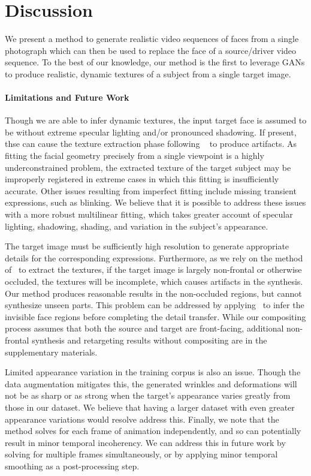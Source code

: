 
\section{Discussion}

We present a method to generate realistic video sequences of faces from a single photograph 
which can then be used to replace the face of a source/driver video sequence. To the best of our knowledge, our method is the first to leverage GANs to produce realistic, dynamic textures of a subject from a single target image.

\paragraph{Limitations and Future Work}
Though we are able to infer dynamic textures, the input target face is assumed to be without extreme specular lighting and/or pronounced shadowing. If present, thse can cause the texture extraction phase following ~\cite{f2f} to produce artifacts. As fitting the facial geometry precisely from a single viewpoint is a highly underconstrained problem, the extracted texture of the target subject may be improperly registered in extreme cases in which this fitting is insufficiently accurate. Other issues resulting from imperfect fitting include missing transient expressions, such as blinking. We believe that it is possible to address these issues with a more robust multilinear fitting, which takes greater account of specular lighting, shadowing, shading, and variation in the subject's appearance.   

The target image must be sufficiently high resolution to generate appropriate details for the corresponding expressions. Furthermore, as we rely on the method of~\cite{f2f} to extract the textures, if the target image is largely non-frontal or otherwise occluded, the textures will be incomplete, which causes artifacts in the synthesis.  Our method produces reasonable results in the non-occluded regions, but cannot synthesize unseen parts. This problem can be addressed by applying~\cite{saito2016} to infer the invisible face regions before completing the detail transfer. While our compositing process assumes that both the source and target are front-facing, additional non-frontal synthesis and retargeting results without compositing are in the supplementary materials.  

Limited appearance variation in the training corpus is also an issue.  Though the data augmentation mitigates this, the generated wrinkles and deformations will not be as sharp or as strong when the target's appearance varies greatly from those in our dataset. We believe that having a larger dataset with even greater appearance variations would resolve address this. Finally, we note that the method solves for each frame of animation independently, and so can potentially result in minor temporal incoherency.  We can address this in future work by solving for multiple frames simultaneously, or by applying minor temporal smoothing as a post-processing step.  



